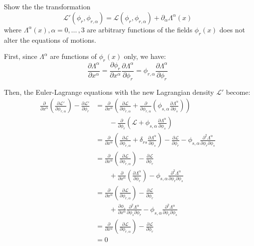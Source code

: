 \documentclass[letterpaper,12pt]{article}
\newenvironment{problem}{\subsection{}\begin{adjustwidth}{0.25in}{}\vspace{-\baselineskip}}{\end{adjustwidth}}
\newcommand{\pder}[2]{\frac{\partial #1}{\partial #2}}
\newcommand{\lagr}{\mathscr{L}}
\begin{document}
\begin{problem}
Show the the transformation
\begin{equation*}
	\lagr'\left(\phi_r, \phi_{r,\alpha}\right) = \lagr\left(\phi_r,\phi_{r,\alpha}\right) + \partial_\alpha \Lambda^\alpha(x)
\end{equation*}
where $\Lambda^\alpha(x), \alpha=0, ... \,, 3$ are arbitrary functions of the fields $\phi_r(x)$ does not alter the equations of motions.

First, since $\Lambda^\alpha$ are functions of $\phi_r(x)$ only, we have:
\begin{equation*}
	\pder{\Lambda^\alpha}{x^\alpha}
	= \pder{\phi_r}{x^\alpha}
	\pder{\Lambda^\alpha}{\phi_r}
	= \phi_{r,\alpha} \pder{\Lambda^\alpha}{\phi_r}
\end{equation*}

Then, the Euler-Lagrange equations with the new Lagrangian density $\lagr'$ become:
\begin{align*}
	\pder{}{x^\alpha}\left(\pder{\lagr'}{\phi_{r,\alpha}}\right) - \pder{\lagr'}{\phi_r}
	&= \pder{}{x^\alpha}\left(\pder{\lagr}{\phi_{r,\alpha}} + \pder{}{\phi_{r,\alpha}}\left(\phi_{s,\alpha}\pder{\Lambda^\alpha}{\phi_s}\right)\right)	\\
	&\qquad - \pder{}{\phi_r}\left(\lagr + \phi_{s,\alpha}\pder{\Lambda^\alpha}{\phi_s}\right)	\\
	&= \pder{}{x^\alpha}\left(\pder{\lagr}{\phi_{r,\alpha}} + \delta_{rs}\pder{\Lambda^\alpha}{\phi_s}\right)	 - \pder{\lagr}{\phi_r} - \phi_{s,\alpha}\frac{\partial^2 \Lambda^\alpha}{\partial\phi_r \partial\phi_s}	\\
	&= \pder{}{x^\alpha}\left(\pder{\lagr}{\phi_{r,\alpha}}\right) -\pder{\lagr}{\phi_r} 	\\
	&\qquad + \pder{}{x^\alpha}\left(\pder{\Lambda^\alpha}{\phi_r}\right) - \phi_{s,\alpha}\frac{\partial^2 \Lambda^\alpha}{\partial\phi_r \partial\phi_s}	\\
	&= \pder{}{x^\alpha}\left(\pder{\lagr}{\phi_{r,\alpha}}\right) -\pder{\lagr}{\phi_r}	\\
	&\qquad + \pder{\phi_s}{x^\alpha}\frac{\partial^2 \Lambda^\alpha}{\partial\phi_s \partial\phi_r} - \phi_{s,\alpha}\frac{\partial^2 \Lambda^\alpha}{\partial\phi_r \partial\phi_s}	\\
	&= \pder{}{x^\alpha}\left(\pder{\lagr}{\phi_{r,\alpha}}\right) -\pder{\lagr}{\phi_r}	\\
	&= 0		 
\end{align*}
\end{problem}
\end{document}
